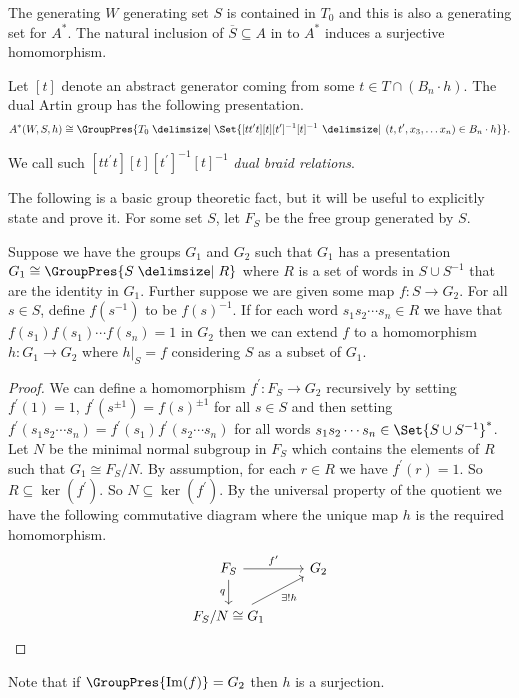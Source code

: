 \begin{theorem}
	The generating $W$ generating set $S$ is contained in $T_0$ and this is also a generating set for $A^*$.
	The natural inclusion of $\overline{S} \subseteq A$ in to $A^*$ induces a surjective homomorphism.
	\label{thm:homo_art_to_dual_art}
\end{theorem}

\begin{theorem}
	Let $[t]$ denote an abstract generator coming from some $t \in T \cap(B_n \cdot h)$. The dual Artin group has the following presentation.
	\[
		A^*(W,S,h) \cong \GroupPres{T_0 \relations \Set{ [t t^\prime t][t][t^\prime]^{-1}[t]^{-1} \given (t,t^\prime,x_3, \ldots x_n) \in B_n \cdot h}}
		.\]
	\label{thm:dual_braid_relations}
\end{theorem}

We call such $[t t^\prime t][t][t^\prime]^{-1}[t]^{-1}$ \emph{dual braid relations}.

The following is a basic group theoretic fact, but it will be useful to explicitly state and prove it. For some set $S$, let $F_S$ be the free group generated by $S$.
\begin{lemma}
	Suppose we have the groups $G_1$ and $G_2$ such that $G_1$ has a presentation $G_1 \cong \GroupPres{S \relations R}$ where $R$ is a set of words in $S \cup S^{-1}$ that are the identity in $G_1$. Further suppose we are given some map $f \colon S \to G_2$. For all $s \in S$, define $f(s^{-1})$ to be $f(s)^{-1}$. If for each word $s_1s_2 \cdots s_n \in R$ we have that $f(s_1)f(s_1)\cdots f(s_n) = 1$ in $G_2$ then we can extend $f$ to a homomorphism  $h \colon G_1 \to G_2$ where $h|_{S} = f$ considering $S$ as a subset of $G_1$. \label{lem:extend_map_to_homomorphism}
\end{lemma}
\begin{proof}
	We can define a homomorphism $f^\prime \colon F_{S} \to G_2$ recursively by setting $f^\prime(1) =1$, $f^\prime(s^{\pm 1}) = f(s)^{\pm 1}$ for all $s \in S$ and then setting $f^\prime(s_1s_2 \cdots s_n) = f^\prime(s_1)f^\prime(s_2\cdots s_n)$ for all words $s_1s_2\cdots s_n \in \Set{S \cup S^{-1}}^*$. Let $N$ be the minimal normal subgroup in $F_{S}$ which contains the elements of $R$ such that $G_1 \cong F_{S}/N$. By assumption, for each $r \in R$ we have $f^\prime(r) = 1$. So $R \subseteq \ker(f^\prime)$. So $N \subseteq \ker(f^\prime)$. By the universal property of the quotient we have the following commutative diagram where the unique map $h$ is the required homomorphism.
	\begin{equation*}
		\begin{tikzcd}
			F_{S} \ar[r, "f^\prime"] \ar[d, "q"'] &G_2 \\
			F_{S}/N \cong G_1 \ar[ru, "\exists ! h"']
		\end{tikzcd}
	\end{equation*}
\end{proof}
Note that if $\GroupPres{\image(f)} = G_2$ then $h$ is a surjection.


